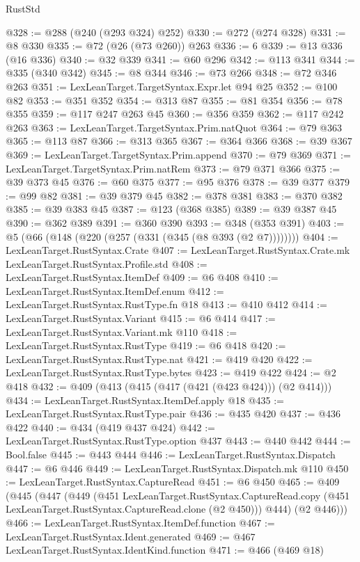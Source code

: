 \begin{lexlean}{RustStd}
\begin{coremodule}
@328 := @288 (@240 (@293 @324) @252)
@330 := @272 (@274 @328)
@331 := @8 @330
@335 := @72 (@26 (@73 @260)) @263
@336 := 6
@339 := @13 @336 (@16 @336)
@340 := @32 @339
@341 := @60 @296
@342 := @113 @341
@344 := @335 (@340 @342)
@345 := @8 @344
@346 := @73 @266
@348 := @72 @346 @263
@351 := LexLeanTarget.TargetSyntax.Expr.let @94 @25
@352 := @100 @82
@353 := @351 @352
@354 := @313 @87
@355 := @81 @354
@356 := @78 @355
@359 := @117 @247 @263 @45
@360 := @356 @359
@362 := @117 @242 @263
@363 := LexLeanTarget.TargetSyntax.Prim.natQuot
@364 := @79 @363
@365 := @113 @87
@366 := @313 @365
@367 := @364 @366
@368 := @39 @367
@369 := LexLeanTarget.TargetSyntax.Prim.append
@370 := @79 @369
@371 := LexLeanTarget.TargetSyntax.Prim.natRem
@373 := @79 @371 @366
@375 := @39 @373 @45
@376 := @60 @375
@377 := @95 @376
@378 := @39 @377
@379 := @99 @82
@381 := @39 @379 @45
@382 := @378 @381
@383 := @370 @382
@385 := @39 @383 @45
@387 := @123 (@368 @385)
@389 := @39 @387 @45
@390 := @362 @389
@391 := @360 @390
@393 := @348 (@353 @391)
@403 := @5 (@66 (@148 (@220 (@257 (@331 (@345 (@8 @393 (@2 @7))))))))
@404 := LexLeanTarget.RustSyntax.Crate
@407 := LexLeanTarget.RustSyntax.Crate.mk LexLeanTarget.RustSyntax.Profile.std
@408 := LexLeanTarget.RustSyntax.ItemDef
@409 := @6 @408
@410 := LexLeanTarget.RustSyntax.ItemDef.enum
@412 := LexLeanTarget.RustSyntax.RustType.fn @18
@413 := @410 @412
@414 := LexLeanTarget.RustSyntax.Variant
@415 := @6 @414
@417 := LexLeanTarget.RustSyntax.Variant.mk @110
@418 := LexLeanTarget.RustSyntax.RustType
@419 := @6 @418
@420 := LexLeanTarget.RustSyntax.RustType.nat
@421 := @419 @420
@422 := LexLeanTarget.RustSyntax.RustType.bytes
@423 := @419 @422
@424 := @2 @418
@432 := @409 (@413 (@415 (@417 (@421 (@423 @424))) (@2 @414)))
@434 := LexLeanTarget.RustSyntax.ItemDef.apply @18
@435 := LexLeanTarget.RustSyntax.RustType.pair
@436 := @435 @420
@437 := @436 @422
@440 := @434 (@419 @437 @424)
@442 := LexLeanTarget.RustSyntax.RustType.option @437
@443 := @440 @442
@444 := Bool.false
@445 := @443 @444
@446 := LexLeanTarget.RustSyntax.Dispatch
@447 := @6 @446
@449 := LexLeanTarget.RustSyntax.Dispatch.mk @110
@450 := LexLeanTarget.RustSyntax.CaptureRead
@451 := @6 @450
@465 := @409
    (@445
      (@447
        (@449
          (@451
            LexLeanTarget.RustSyntax.CaptureRead.copy
            (@451 LexLeanTarget.RustSyntax.CaptureRead.clone (@2 @450)))
          @444)
        (@2 @446)))
@466 := LexLeanTarget.RustSyntax.ItemDef.function
@467 := LexLeanTarget.RustSyntax.Ident.generated
@469 := @467 LexLeanTarget.RustSyntax.IdentKind.function
@471 := @466 (@469 @18)

\end{coremodule}
\end{lexlean}
